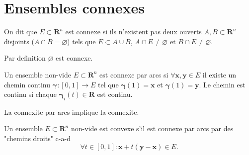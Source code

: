 \section{Ensembles connexes}
\begin{definition}[Connexite]
On dit que $E\subset \mathbf{R}^{n}$ est connexe si ils n'existent pas deux ouverts $A,B\subset \mathbf{R}^{n}$ disjoints ($A\cap B= \varnothing$) tels que $E\subset A\cup B$, $A\cap E\neq \varnothing$ et $B\cap E\neq \varnothing$.
\end{definition}
\begin{remark}
Par definition $\varnothing$ est connexe.
\end{remark}
\begin{definition}
Un ensemble non-vide $E\subset \mathbf{R}^{n}$ est connexe par arcs si $\forall \boldsymbol{x},\boldsymbol{y}\in E$ il existe un chemin continu $\boldsymbol{\gamma}:[0,1]\to E$ tel que $\boldsymbol{\gamma}(1)=\boldsymbol{x}$ et $\boldsymbol{\gamma}(1)=\boldsymbol{y}$. Le chemin est continu si chaque $\boldsymbol{\gamma}_{i}(t)\in \mathbf{R}$ est continu.
\end{definition}
\begin{remark}
La connexite par arcs implique la connexite.
\end{remark}
\begin{definition}[Convexite]
Un ensemble $E\subset \mathbf{R}^{n}$ non-vide est convexe s'il est connexe par arcs par des "chemins droits" c-a-d
$$
\forall t\in[0,1]:\boldsymbol{x}+t(\boldsymbol{y}-\boldsymbol{x})\in E.
$$
\end{definition}

